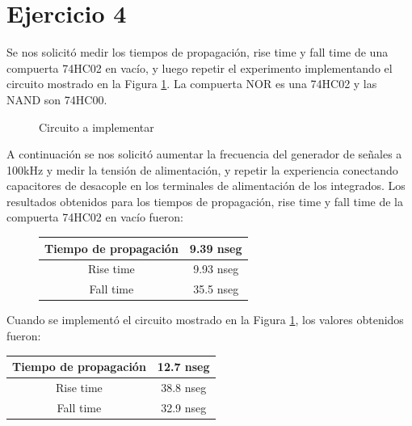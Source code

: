 \part*{Ejercicio 4}
Se nos solicitó medir los tiempos de propagación, rise time y fall time de una compuerta 74HC02 en vacío, y luego repetir el experimento implementando el circuito mostrado en la Figura \ref{4_fig3}. La compuerta NOR es una 74HC02 y las NAND son 74HC00.
%

\begin{figure}
\begin{center}
\resizebox{.5\linewidth}{!}{\parbox{\linewidth}{}}
\caption{Circuito a implementar}
\label{4_fig3}
\end{center}
\end{figure}

A continuación se nos solicitó aumentar la frecuencia del generador de señales a 100kHz y medir la tensión de alimentación, y repetir la experiencia conectando capacitores de desacople en los terminales de alimentación de los integrados.
Los resultados obtenidos para los tiempos de propagación, rise time y fall time de la compuerta 74HC02 en vacío fueron:

\begin{figure}[H]
\begin{flushright}
\begin{tabular}{|c|c|}
\hline 
Tiempo de propagación & 9.39 nseg \\ 
\hline 
Rise time & 9.93 nseg \\ 
\hline 
Fall time & 35.5 nseg \\ 
\hline 
\end{tabular}
\end{flushright}
\end{figure}

Cuando se implementó el circuito mostrado en la Figura \ref{4_fig3}, los valores obtenidos fueron:

\begin{center}
\begin{tabular}{|c|c|}
\hline 
Tiempo de propagación & 12.7 nseg \\ 
\hline 
Rise time & 38.8 nseg \\ 
\hline 
Fall time & 32.9 nseg \\ 
\hline 
\end{tabular}
\end{center}

